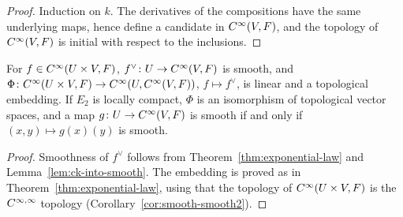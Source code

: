 \begin{proof}
  \leanok
  Induction on $k$. The derivatives of the compositions have the same underlying maps, hence
  define a candidate in $C^{\infty}(V, F)$, and the topology of $C^{\infty}(V, F)$ is initial
  with respect to the inclusions.
\end{proof}

\begin{theorem}
  \label{thm:smooth-exponential-law}
  \leanok
  For $f \in C^{\infty}(U \times V, F)$, $f^\vee \colon U \to C^{\infty}(V, F)$ is smooth, and
  $\Phi \colon C^{\infty}(U \times V, F) \to C^{\infty}(U, C^{\infty}(V, F))$,
  $f \mapsto f^\vee$, is linear and a topological embedding. If $E_2$ is locally compact, $\Phi$
  is an isomorphism of topological vector spaces, and a map $g \colon U \to C^{\infty}(V, F)$ is
  smooth if and only if $(x, y) \mapsto g(x)(y)$ is smooth.
\end{theorem}

\begin{proof}
  \leanok
  Smoothness of $f^\vee$ follows from Theorem~\ref{thm:exponential-law} and
  Lemma~\ref{lem:ck-into-smooth}. The embedding is proved as in
  Theorem~\ref{thm:exponential-law}, using that the topology of $C^{\infty}(U \times V, F)$ is
  the $C^{\infty,\infty}$ topology (Corollary~\ref{cor:smooth-smooth2}).
\end{proof}
